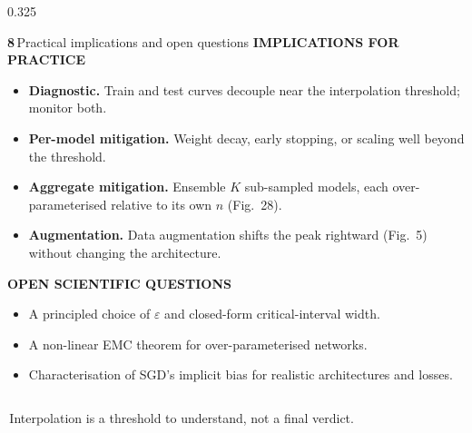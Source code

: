 \documentclass[final]{beamer}
\newcommand{\sectnum}[1]{\textcolor{accentgold}{\bfseries #1}\,}
\newcommand{\kw}[1]{\textcolor{uompurple}{\textbf{#1}}}
\newcommand{\eyebrow}[1]{{\color{uompurple}\scriptsize\bfseries\MakeUppercase{#1}}\par\vspace{-0.2ex}}
\newcommand{\bigtakeaway}[1]{%
  \par\noindent\colorbox{uompurple}{\parbox{\linewidth-2\fboxsep}{\centering\bfseries\Large\color{white}\strut\,#1\,\strut}}\par}
\begin{document}
\begin{frame}[t]{}
\begin{columns}[T,onlytextwidth]
\begin{column}{0.325\linewidth}
\begin{block}{\sectnum{8}Practical implications and open questions}
\eyebrow{Implications for practice}
\begin{itemize}\setlength\itemsep{0.2ex}
\item \kw{Diagnostic.} Train and test curves decouple near the interpolation threshold; monitor both.
\item \kw{Per-model mitigation.} Weight decay, early stopping, or scaling well beyond the threshold.
\item \kw{Aggregate mitigation.} Ensemble \(K\) sub-sampled models, each over-parameterised relative to its own \(n\) (Fig.~28).
\item \kw{Augmentation.} Data augmentation shifts the peak rightward (Fig.~5) without changing the architecture.
\end{itemize}
\eyebrow{Open scientific questions}
\begin{itemize}\setlength\itemsep{0.2ex}
\item A principled choice of \(\varepsilon\) and closed-form critical-interval width.
\item A non-linear EMC theorem for over-parameterised networks.
\item Characterisation of SGD's implicit bias for realistic architectures and losses.
\end{itemize}
\end{block}
\end{column}

\end{columns}

\vspace{0.05cm}
\bigtakeaway{Interpolation is a threshold to understand, not a final verdict.}
\vspace{0.1cm}


\end{frame}
\end{document}
